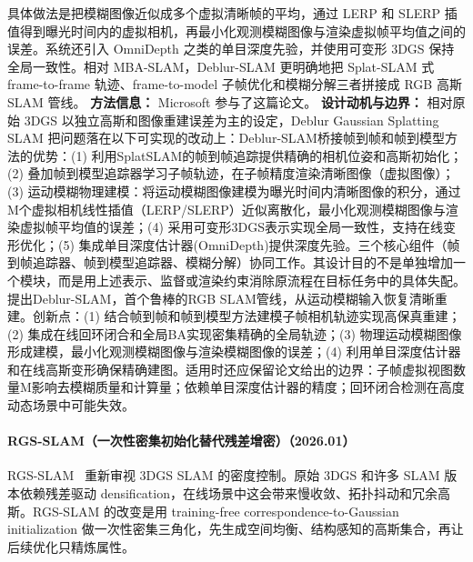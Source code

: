具体做法是把模糊图像近似成多个虚拟清晰帧的平均，通过 LERP 和 SLERP 插值得到曝光时间内的虚拟相机，再最小化观测模糊图像与渲染虚拟帧平均值之间的误差。系统还引入 OmniDepth 之类的单目深度先验，并使用可变形 3DGS 保持全局一致性。相对 MBA-SLAM，Deblur-SLAM 更明确地把 Splat-SLAM 式 frame-to-frame 轨迹、frame-to-model 子帧优化和模糊分解三者拼接成 RGB 高斯 SLAM 管线。
\textbf{方法信息：} Microsoft 参与了这篇论文。
\textbf{设计动机与边界：} 相对原始 3DGS 以独立高斯和图像重建误差为主的设定，Deblur Gaussian Splatting SLAM 把问题落在以下可实现的改动上：Deblur-SLAM桥接帧到帧和帧到模型方法的优势：(1) 利用SplatSLAM的帧到帧追踪提供精确的相机位姿和高斯初始化；(2) 叠加帧到模型追踪器学习子帧轨迹，在子帧精度渲染清晰图像（虚拟图像）；(3) 运动模糊物理建模：将运动模糊图像建模为曝光时间内清晰图像的积分，通过M个虚拟相机线性插值（LERP/SLERP）近似离散化，最小化观测模糊图像与渲染虚拟帧平均值的误差；(4) 采用可变形3DGS表示实现全局一致性，支持在线变形优化；(5) 集成单目深度估计器(OmniDepth)提供深度先验。三个核心组件（帧到帧追踪器、帧到模型追踪器、模糊分解）协同工作。其设计目的不是单独增加一个模块，而是用上述表示、监督或渲染约束消除原流程在目标任务中的具体失配。提出Deblur-SLAM，首个鲁棒的RGB SLAM管线，从运动模糊输入恢复清晰重建。创新点：(1) 结合帧到帧和帧到模型方法建模子帧相机轨迹实现高保真重建；(2) 集成在线回环闭合和全局BA实现密集精确的全局轨迹；(3) 物理运动模糊图像形成建模，最小化观测模糊图像与渲染模糊图像的误差；(4) 利用单目深度估计器和在线高斯变形确保精确建图。适用时还应保留论文给出的边界：子帧虚拟视图数量M影响去模糊质量和计算量；依赖单目深度估计器的精度；回环闭合检测在高度动态场景中可能失效。
\paragraph{RGS-SLAM（一次性密集初始化替代残差增密）（2026.01）}
RGS-SLAM~\cite{2601_00705} 重新审视 3DGS SLAM 的密度控制。原始 3DGS 和许多 SLAM 版本依赖残差驱动 densification，在线场景中这会带来慢收敛、拓扑抖动和冗余高斯。RGS-SLAM 的改变是用 training-free correspondence-to-Gaussian initialization 做一次性密集三角化，先生成空间均衡、结构感知的高斯集合，再让后续优化只精炼属性。

